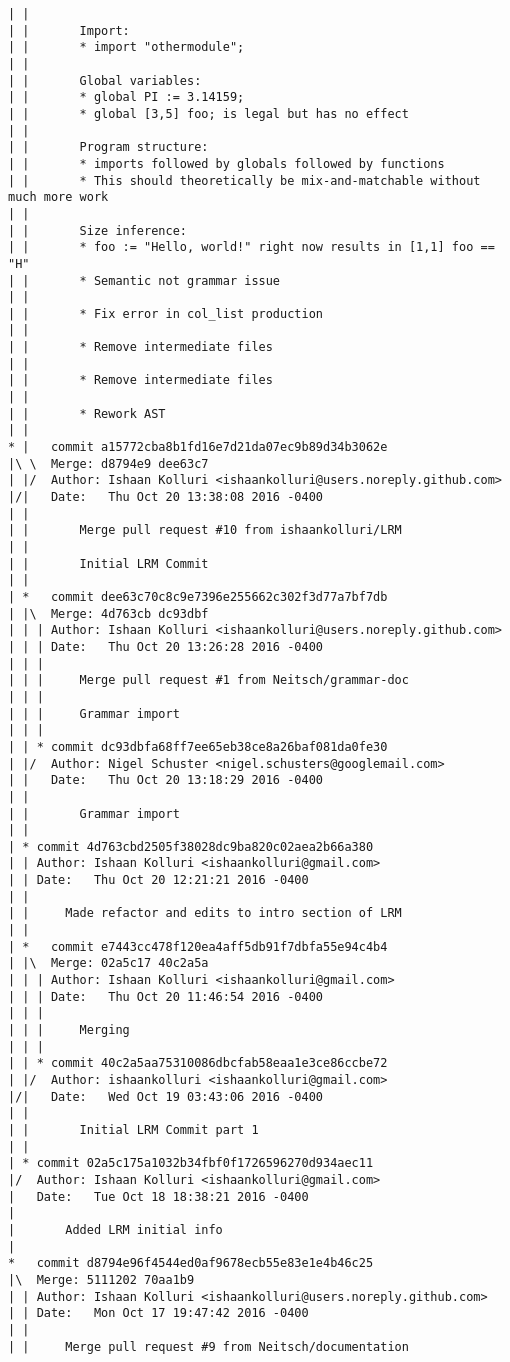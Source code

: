 \begin{lstlisting}
| |       
| |       Import:
| |       * import "othermodule";
| |       
| |       Global variables:
| |       * global PI := 3.14159;
| |       * global [3,5] foo; is legal but has no effect
| |       
| |       Program structure:
| |       * imports followed by globals followed by functions
| |       * This should theoretically be mix-and-matchable without much more work
| |       
| |       Size inference:
| |       * foo := "Hello, world!" right now results in [1,1] foo == "H"
| |       * Semantic not grammar issue
| |       
| |       * Fix error in col_list production
| |       
| |       * Remove intermediate files
| |       
| |       * Remove intermediate files
| |       
| |       * Rework AST
| |     
* |   commit a15772cba8b1fd16e7d21da07ec9b89d34b3062e
|\ \  Merge: d8794e9 dee63c7
| |/  Author: Ishaan Kolluri <ishaankolluri@users.noreply.github.com>
|/|   Date:   Thu Oct 20 13:38:08 2016 -0400
| |   
| |       Merge pull request #10 from ishaankolluri/LRM
| |       
| |       Initial LRM Commit
| |     
| *   commit dee63c70c8c9e7396e255662c302f3d77a7bf7db
| |\  Merge: 4d763cb dc93dbf
| | | Author: Ishaan Kolluri <ishaankolluri@users.noreply.github.com>
| | | Date:   Thu Oct 20 13:26:28 2016 -0400
| | | 
| | |     Merge pull request #1 from Neitsch/grammar-doc
| | |     
| | |     Grammar import
| | |    
| | * commit dc93dbfa68ff7ee65eb38ce8a26baf081da0fe30
| |/  Author: Nigel Schuster <nigel.schusters@googlemail.com>
| |   Date:   Thu Oct 20 13:18:29 2016 -0400
| |   
| |       Grammar import
| |   
| * commit 4d763cbd2505f38028dc9ba820c02aea2b66a380
| | Author: Ishaan Kolluri <ishaankolluri@gmail.com>
| | Date:   Thu Oct 20 12:21:21 2016 -0400
| | 
| |     Made refactor and edits to intro section of LRM
| |     
| *   commit e7443cc478f120ea4aff5db91f7dbfa55e94c4b4
| |\  Merge: 02a5c17 40c2a5a
| | | Author: Ishaan Kolluri <ishaankolluri@gmail.com>
| | | Date:   Thu Oct 20 11:46:54 2016 -0400
| | | 
| | |     Merging
| | |    
| | * commit 40c2a5aa75310086dbcfab58eaa1e3ce86ccbe72
| |/  Author: ishaankolluri <ishaankolluri@gmail.com>
|/|   Date:   Wed Oct 19 03:43:06 2016 -0400
| |   
| |       Initial LRM Commit part 1
| |   
| * commit 02a5c175a1032b34fbf0f1726596270d934aec11
|/  Author: Ishaan Kolluri <ishaankolluri@gmail.com>
|   Date:   Tue Oct 18 18:38:21 2016 -0400
|   
|       Added LRM initial info
|    
*   commit d8794e96f4544ed0af9678ecb55e83e1e4b46c25
|\  Merge: 5111202 70aa1b9
| | Author: Ishaan Kolluri <ishaankolluri@users.noreply.github.com>
| | Date:   Mon Oct 17 19:47:42 2016 -0400
| | 
| |     Merge pull request #9 from Neitsch/documentation

\end{lstlisting}
